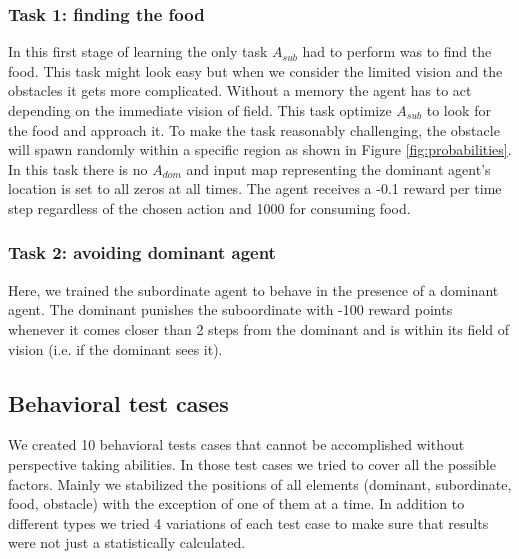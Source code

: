 \documentclass{article}
\begin{document}
\subsubsection{Task 1: finding the food} \label{task1}
In this first stage of learning the only task \(A_{sub}\) had to perform was to find the food. This task might look easy but when we consider the limited vision and the obstacles it gets more complicated. Without a memory the agent has to act depending on the immediate vision of field. This task optimize \(A_{sub}\) to look for the food and approach it. To make the task reasonably challenging, the obstacle will spawn randomly within a specific region as shown in Figure \ref{fig:probabilities}. In this task there is no $A_{dom}$ and input map representing the dominant agent's location is set to all zeros at all times. The agent receives a -0.1 reward per time step regardless of the chosen action and 1000 for consuming food.
\subsubsection{Task 2: avoiding dominant agent}\label{task2}
Here, we trained the subordinate agent to behave in the presence of a dominant agent. The dominant punishes the suboordinate with -100 reward points whenever it comes closer than 2 steps from the dominant and is within its field of vision (i.e. if the dominant sees it). 
 
\subsection{Behavioral test cases}\label{agents.behavior}
We created 10 behavioral tests cases that cannot be accomplished without perspective taking abilities. In those test cases we tried to cover all the possible factors. Mainly we stabilized the positions of all elements (dominant, subordinate, food, obstacle) with the exception of one of them at a time.
In addition to different types we tried 4 variations of each test case to make sure that results were not just a statistically calculated. 
\end{document}
